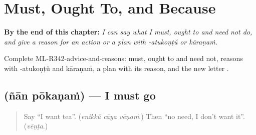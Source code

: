 
\chapter{Must, Ought To, and Because}
\label{ch:ml-must-ought-to-and-because}

\begin{chapteropening}
\textbf{By the end of this chapter:} \emph{I can say what I must, ought to and need not do, and give a reason for an action or a plan with -atukoṇṭŭ or kāraṇaṁ.}

Complete ML-R342-advice-and-reasons: must, ought to and need not, reasons with -atukoṇṭŭ and kāraṇaṁ, a plan with its reason, and the new letter .
\end{chapteropening}

\section[\texorpdfstring{\ml{ഞാൻ} \ml{പോകണം} (ñān pōkaṇaṁ)}{ഞാൻ പോകണം (ñān pōkaṇaṁ)}]{  (ñān pōkaṇaṁ) — I must go}

\label{lesson:ML-C342-pokanam}



\begin{quote}
Say \textquotedblleft{}I want tea\textquotedblright{}. (\emph{enikkŭ cāya vēṇaṁ}.) Then \textquotedblleft{}no need, I don't want it\textquotedblright{}. (\emph{vēṇṭa}.)
\end{quote}

